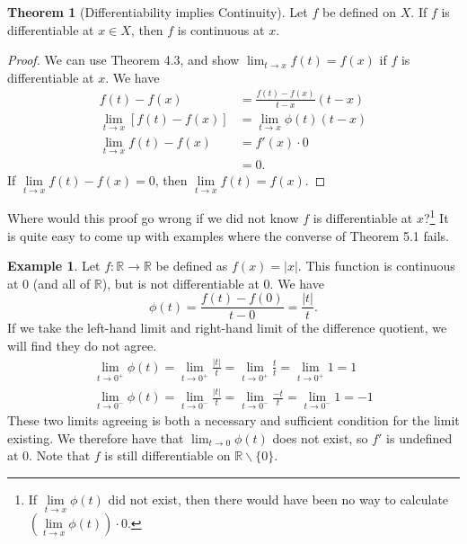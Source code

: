 \documentclass{article}
\newcommand{\R}{\mathbb{R}}
\theoremstyle{definition}
\newtheorem{theorem}{Theorem}[section]
\newtheorem{example}{Example}[section]
\begin{document}
	\begin{theorem}[Differentiability implies Continuity]
		Let $ f $ be defined on $  X $. If $ f $ is differentiable at $ x\in  X $, then $ f $ is continuous at $ x $.  
	\end{theorem}
	\begin{proof}
		We can use Theorem 4.3, and show $ \lim_{t\to x}f(t)=f(x) $ if $ f $ is differentiable at $ x $. We have
		\begin{align*}
			f(t)-f(x)&=\frac{f(t)-f(x)}{t-x}(t-x)\\
			\lim\limits_{t\to x}[f(t)-f(x)]&=\lim\limits_{t\to x}\phi(t)(t-x)\\\lim\limits_{t\to x}f(t)-f(x)&=f'(x)\cdot 0\\&=0.
		\end{align*}
		If $ \lim\limits_{t\to x}f(t)-f(x)=0 $, then $ \lim\limits_{t\to x}f(t)=f(x) $. 
	\end{proof}
	Where would this proof go wrong if we did not know $ f $ is differentiable at $ x $?\footnote{ If $ \lim\limits_{t\to x}\phi(t) $ did not exist, then there would have been no way to calculate $ (\lim\limits_{t\to x}\phi(t))\cdot 0 $. } It is quite easy to come up with examples where the converse of Theorem 5.1 fails. 
	\begin{example}
		Let $ f:\R\to\R $ be defined as $ f(x)=|x| $. This function is continuous at $ 0 $ (and all of $ \R $), but is not differentiable at $ 0 $. We have $$\phi(t)=\frac{f(t)-f(0)}{t-0}=\frac{|t|}{t} .$$ If we take the left-hand limit and right-hand limit of the difference quotient, we will find they do not agree.
		\begin{align*}
			\lim\limits_{t\to 0^+}\phi(t)=\lim\limits_{t\to 0^+}\frac{|t|}{t}=\lim\limits_{t\to 0^+}\frac{t}{t}=\lim\limits_{t\to 0^+}1=1\\\lim\limits_{t\to 0^-}\phi(t)=\lim\limits_{t\to 0^-}\frac{|t|}{t}=\lim\limits_{t\to 0^-}\frac{-t}{t}=\lim\limits_{t\to 0^-}1=-1
		\end{align*}
		These two limits agreeing is both a necessary and sufficient condition for the limit existing. We therefore have that $ \lim_{t\to 0}\phi(t) $ does not exist, so $ f' $ is undefined at $ 0 $. Note that $ f $ is still differentiable on $ \R\backslash\{0\} $. 
	\end{example} 
\end{document}
